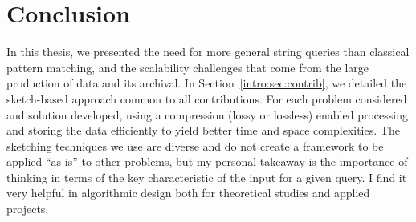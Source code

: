 \clearemptydoublepage
{}
\chapter*{Conclusion}
In this thesis, we presented the need for more general string queries than classical pattern matching, and the scalability challenges that come from the large production of data and its archival.
%
In Section~\ref*{intro:sec:contrib}, we detailed the sketch-based approach common to all contributions. For each problem considered and solution developed, using a compression (lossy or lossless) enabled processing and storing the data efficiently to yield better time and space complexities.
%
The sketching techniques we use are diverse and do not create a framework to be applied ``as is'' to other problems, but my personal takeaway is the importance of thinking in terms of the key characteristic of the input for a given query. I find it very helpful in algorithmic design both for theoretical studies and applied projects.
%
%
%
%
